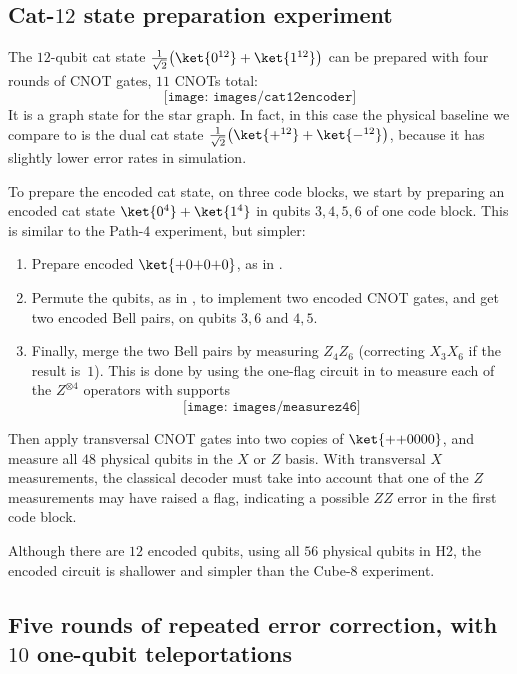 \documentclass[10pt, twocolumn, aps, nofootinbib, longbibliography, nobibnotes, superscriptaddress]{revtex4-1} %
\begin{document}
\subsection{Cat-$12$ state preparation experiment}

The $12$-qubit cat state $\tfrac{1}{\sqrt 2}\big(\ket{0^{12}} + \ket{1^{12}}\big)$ can be prepared with four rounds of CNOT gates, $11$ CNOTs total: 
$$
\texttt{[image: images/cat12encoder]}
$$
It is a graph state for the star graph.  In fact, in this case the physical baseline we compare to is the dual cat state $\tfrac{1}{\sqrt 2}\big(\ket{+^{12}} + \ket{-^{12}}\big)$, because it has slightly lower error rates in simulation.  

To prepare the encoded cat state, on three code blocks, we start by preparing an encoded cat state $\ket{0^4} + \ket{1^4}$ in qubits $3,4,5,6$ of one code block.  This is similar to the Path-$4$ experiment, but simpler: 
\begin{enumerate}[leftmargin=*]
\item 
Prepare encoded $\ket{{+}0{+}0{+}0}$, as in .  
\item 
Permute the qubits, as in , to implement two encoded CNOT gates, and get two encoded Bell pairs, on qubits $3,6$ and $4,5$.  
\item 
Finally, merge the two Bell pairs by measuring $Z_4 Z_6$ (correcting $X_3 X_6$ if the result is~$1$).  This is done by using the one-flag circuit in  to measure each of the $Z^{\otimes 4}$ operators with supports 
$$
\texttt{[image: images/measurez46]}
$$
\end{enumerate}
Then apply transversal CNOT gates into two copies of $\ket{{+}{+}0000}$, and measure all $48$ physical qubits in the $X$ or $Z$ basis.  With transversal $X$ measurements, the classical decoder must take into account that one of the $Z$ measurements may have raised a flag, indicating a possible $ZZ$ error in the first code block.  

Although there are $12$ encoded qubits, using all $56$ physical qubits in H2, the encoded circuit is shallower and simpler than the Cube-$8$ experiment.  %


\subsection{Five rounds of repeated error correction, with $10$ one-qubit teleportations}
\end{document}
